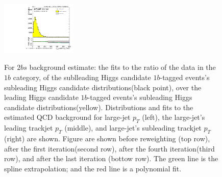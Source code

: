 \begin{figure}[htbp!]
\begin{center}
\includegraphics[width=0.32\textwidth,angle=-90]{figures/boosted/Reweight/Fits/Moriond_bkg_9_NoTag_2Trk_split_lead_Incl_sublHCand_trk1_Pt.pdf} \\
\caption{For $2bs$ background estimate: the fits to the ratio of the data in the $1b$ category, of the sublleading Higgs candidate $1b$-tagged events's subleading Higgs candidate distributions(black point), over the leading Higgs candidate $1b$-tagged events's subleading Higgs candidate distributions(yellow). Distributions and fits to the estimated QCD background for large-\R jet $p_{T}$ (left),  the large-\R jet's leading trackjet $p_T$ (middle), and large-\R jet's subleading trackjet $p_T$ (right) are shown.  Figure are shown before reweighting (top row), after the first iteration(second row), after the fourth iteration(third row), and after the last iteration (bottow row). The green line is the spline extrapolation; and the red line is a polynomial fit.}
\label{fig:rw-2bs-lead}
\end{center}
\end{figure}

